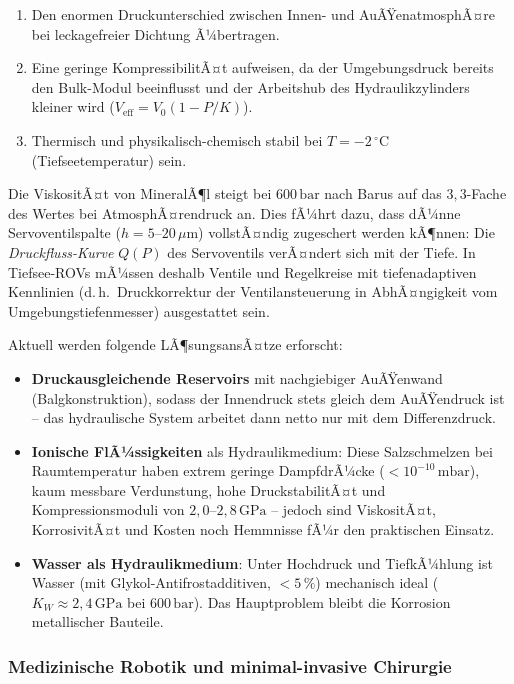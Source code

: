 ﻿\documentclass[a4paper,12pt]{scrreprt}
\theoremstyle{definition}
\begin{document}
\begin{enumerate}
  \item Den enormen Druckunterschied zwischen Innen- und AuÃŸenatmosphÃ¤re
    bei leckagefreier Dichtung Ã¼bertragen.
  \item Eine geringe KompressibilitÃ¤t aufweisen, da der Umgebungsdruck
    bereits den Bulk-Modul beeinflusst und der Arbeitshub des
    Hydraulikzylinders kleiner wird ($V_{\mathrm{eff}} = V_0 (1 - P/K)$).
  \item Thermisch und physikalisch-chemisch stabil bei
    $T = -2\,{^\circ}\mathrm{C}$ (Tiefseetemperatur) sein.
\end{enumerate}

Die ViskositÃ¤t von MineralÃ¶l steigt bei $600\,\mathrm{bar}$ nach
Barus auf das $3{,}3$-Fache des Wertes bei AtmosphÃ¤rendruck an. Dies
fÃ¼hrt dazu, dass dÃ¼nne Servoventilspalte ($h = 5$--$20\,\mu\mathrm{m}$)
vollstÃ¤ndig zugeschert werden kÃ¶nnen: Die \emph{Druckfluss-Kurve}
$Q(P)$ des Servoventils verÃ¤ndert sich mit der Tiefe. In Tiefsee-ROVs
mÃ¼ssen deshalb Ventile und Regelkreise mit tiefenadaptiven Kennlinien
(d.\,h.\ Druckkorrektur der Ventilansteuerung in AbhÃ¤ngigkeit vom
Umgebungstiefenmesser) ausgestattet sein.

Aktuell werden folgende LÃ¶sungsansÃ¤tze erforscht:
\begin{itemize}
  \item \textbf{Druckausgleichende Reservoirs} mit nachgiebiger
    AuÃŸenwand (Balgkonstruktion), sodass der Innendruck stets gleich
    dem AuÃŸendruck ist -- das hydraulische System arbeitet dann
    netto nur mit dem Differenzdruck.
  \item \textbf{Ionische FlÃ¼ssigkeiten} als Hydraulikmedium:
    Diese Salzschmelzen bei Raumtemperatur haben extrem geringe
    DampfdrÃ¼cke ($< 10^{-10}\,\mathrm{mbar}$), kaum messbare
    Verdunstung, hohe DruckstabilitÃ¤t und Kompressionsmoduli
    von $2{,}0$--$2{,}8\,\mathrm{GPa}$ -- jedoch sind ViskositÃ¤t,
    KorrosivitÃ¤t und Kosten noch Hemmnisse fÃ¼r den praktischen Einsatz.
  \item \textbf{Wasser als Hydraulikmedium}: Unter Hochdruck und
    TiefkÃ¼hlung ist Wasser (mit Glykol-Antifrostadditiven, $< 5\,\%$)
    mechanisch ideal ($K_W \approx 2{,}4\,\mathrm{GPa}$ bei
    $600\,\mathrm{bar}$). Das Hauptproblem bleibt die Korrosion
    metallischer Bauteile.
\end{itemize}

\subsubsection{Medizinische Robotik und minimal-invasive Chirurgie}
\end{document}
